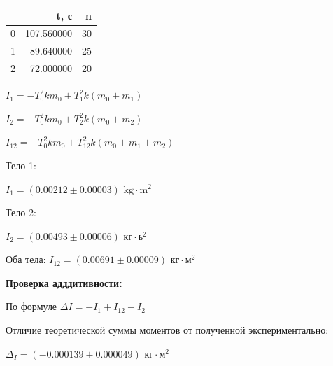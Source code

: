 \documentclass[12pt]{extarticle}
\begin{document}
\begin{center}
\begin{tabular}{lrr}
\toprule
 & t, с & n \\
\midrule
0 & 107.560000 & 30 \\
1 & 89.640000 & 25 \\
2 & 72.000000 & 20 \\
\bottomrule
\end{tabular}
\end{center}

\vspace{3mm}

$\displaystyle I_{1} = - T_{0}^{2} k m_{0} + T_{1}^{2} k \left(m_{0} + m_{1}\right)$

\vspace{3mm}

$\displaystyle I_{2} = - T_{0}^{2} k m_{0} + T_{2}^{2} k \left(m_{0} + m_{2}\right)$

\vspace{3mm}

$\displaystyle I_{12} = - T_{0}^{2} k m_{0} + T_{12}^{2} k \left(m_{0} + m_{1} + m_{2}\right)$


Тело 1:
\vspace{3mm}

$I_1 = (0.00212 \pm 0.00003) \text{ kg} \cdot \text{m}^2$
\vspace{3mm}

Тело 2:
\vspace{3mm}

$I_2 = (0.00493 \pm 0.00006) \text{ кг} \cdot \text{ь}^2$

\vspace{3mm}

Оба тела:
\vspace{3mm}
$I_{12} = (0.00691 \pm 0.00009) \text{ кг} \cdot \text{м}^2$


\vspace{5mm}

\textbf{\large{Проверка адддитивности:}}

\vspace{3mm}

По формуле $\displaystyle \Delta I = - I_{1} + I_{12} - I_{2}$

\vspace{3mm}

Отличие теоретической суммы моментов от полученной экспериментально:

\vspace{3mm}

$\Delta_I = (-0.000139 \pm 0.000049) \text{ кг} \cdot \text{м}^2$ 
\end{document}
